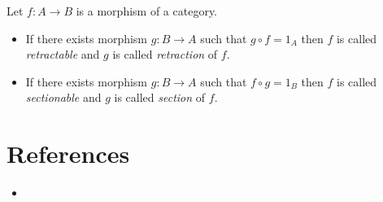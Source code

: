 \documentclass[12pt]{article}
\begin{document}
Let $f: A\rightarrow B$ is a morphism of a category.

\begin{itemize}
\item If there exists morphism $g: B\rightarrow A$ such that $g\circ f=1_A$ then $f$ is called \emph{retractable} and $g$ is called \emph{retraction} of $f$.
\item If there exists morphism $g: B\rightarrow A$ such that $f\circ g=1_B$ then $f$ is called \emph{sectionable} and $g$ is called \emph{section} of $f$.
\end{itemize}

\section{References}

\begin{itemize}
\item {}
\end{itemize}
\end{document}
